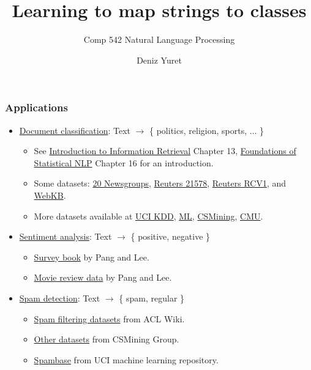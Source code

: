\documentclass[ignorenonframetext,plain]{beamer}
\title{Learning to map strings to classes}
\subtitle{Comp 542 Natural Language Processing}
\author{Deniz Yuret}
\begin{document}
\begin{frame}
\maketitle
\end{frame}

\begin{frame}\frametitle{Applications}
\begin{itemize}
\item
  \href{http://en.wikipedia.org/wiki/Document_classification}{Document
    classification}: Text $\rightarrow$ \{ politics, religion, 
  sports, $\dots$ \}
\begin{itemize}
\item See \href{http://www-nlp.stanford.edu/IR-book}{Introduction to
  Information Retrieval} Chapter 13,
  \href{http://nlp.stanford.edu/fsnlp}{Foundations of Statistical NLP}
  Chapter 16 for an introduction.
\item Some datasets: \href{http://qwone.com/~jason/20Newsgroups}{20 Newsgroups},
  \href{http://www.daviddlewis.com/resources/testcollections/reuters21578}{Reuters
    21578}, 
  \href{http://www.ai.mit.edu/projects/jmlr/papers/volume5/lewis04a/lyrl2004_rcv1v2_README.htm}{Reuters
    RCV1}, and \href{http://www.cs.cmu.edu/~webkb/}{WebKB}.
\item More datasets available at \href{http://kdd.ics.uci.edu}{UCI
  KDD}, \href{http://archive.ics.uci.edu/ml/index.html}{ML},
  \href{http://csmining.org/index.php/data.html}{CSMining},
  \href{http://www.cs.cmu.edu/~TextLearning/datasets.html}{CMU}.
\end{itemize}
\item \href{http://en.wikipedia.org/wiki/Sentiment_analysis}{Sentiment
  analysis}: Text $\rightarrow$ \{ positive, negative \}
\begin{itemize}
\item
  \href{http://www.cs.cornell.edu/home/llee/opinion-mining-sentiment-analysis-survey.html}{Survey
    book} by Pang and Lee.
\item
  \href{http://www.cs.cornell.edu/people/pabo/movie-review-data}{Movie
    review data} by Pang and Lee.
\end{itemize}
\item \href{http://en.wikipedia.org/wiki/Anti-spam_techniques}{Spam
  detection}: Text $\rightarrow$ \{ spam, regular \}
\begin{itemize}
\item
  \href{http://www.aclweb.org/aclwiki/index.php?title=Spam_filtering_datasets}{Spam
  filtering datasets} from ACL Wiki.
\item \href{http://csmining.org/index.php/data.html}{Other datasets} from
  CSMining Group.
\item \href{http://archive.ics.uci.edu/ml/datasets/Spambase}{Spambase}
  from UCI machine learning repository.
\end{itemize}
\end{itemize}
\end{frame}
\end{document}
